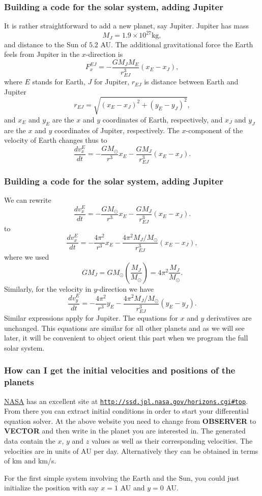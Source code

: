 \documentclass{beamer}
\begin{document}
\begin{frame}
\frametitle{Building a code for the solar system, adding Jupiter}

\begin{block}{}
It is rather straightforward to add a new planet, say Jupiter.
Jupiter has mass
\[
M_J=1.9\times 10^{27}\mathrm{kg},
\]
and distance to the Sun of $5.2$ AU. 
The additional gravitational force the Earth feels from Jupiter in the $x$-direction is
  \[
   F_{x}^{EJ}=-\frac{GM_JM_E}{r_{EJ}^3}(x_E-x_J),
  \]
where $E$ stands for Earth, $J$ for Jupiter, $r_{EJ}$ is distance between Earth and Jupiter
\[
r_{EJ} = \sqrt{(x_E-x_J)^2+(y_E-y_J)^2},
\]
and $x_E$ and $y_E$ are the $x$ and $y$ coordinates of Earth, respectively, and 
$x_J$ and $y_J$ are the $x$ and $y$ coordinates of Jupiter, respectively.
The $x$-component of the velocity of Earth changes thus to
\[
   \frac{dv_x^E}{dt}=-\frac{GM_{\odot}}{r^3}x_E-\frac{GM_J}{r_{EJ}^3}(x_E-x_J).
\]
\end{block}
\end{frame}

\begin{frame}
\frametitle{Building a code for the solar system, adding Jupiter}

\begin{block}{}
We can rewrite 
\[
   \frac{dv_x^E}{dt}=-\frac{GM_{\odot}}{r^3}x_E-\frac{GM_J}{r_{EJ}^3}(x_E-x_J).
\]
to
\[
   \frac{dv_x^E}{dt}=-\frac{4\pi^2}{r^3}x_E-\frac{4\pi^2M_J/M_{\odot}}{r_{EJ}^3}(x_E-x_J),
\]
where we used 
\[
GM_J = GM_{\odot}\left(\frac{M_J}{M_{\odot}}\right)=4\pi^2 \frac{M_J}{M_{\odot}}.
\]
Similarly, for the velocity in $y$-direction we have 
\[
   \frac{dv_y^E}{dt}=-\frac{4\pi^2}{r^3}y_E-\frac{4\pi^2M_J/M_{\odot}}{r_{EJ}^3}(y_E-y_J).
\]
Similar expressions apply for Jupiter. The equations for $x$ and $y$ 
derivatives are unchanged. This equations are similar for all other planets and as we will see later, it will be convenient to object orient this part when we program the full solar system.
\end{block}
\end{frame}

\begin{frame}
\frametitle{How can I get the initial velocities and positions of the planets}

\begin{block}{}
\href{{http://www.nasa.gov/index.html}}{NASA} has an excellent site at \href{{http://ssd.jpl.nasa.gov/horizons.cgi#top}}{\nolinkurl{http://ssd.jpl.nasa.gov/horizons.cgi\#top}}.
From there you can extract initial conditions in order to start your differential equation solver.
At the above website you need to change from \textbf{OBSERVER} to \textbf{VECTOR} and then write in the planet you are interested in.
The generated data contain the $x$, $y$ and $z$ values as well as their corresponding velocities. The velocities are in units of AU per day.
Alternatively they can be obtained in terms of km and km/s. 

For the first simple system involving the Earth and the Sun, you could just initialize the position with say $x=1$ AU
and $y=0$ AU. 
\end{block}
\end{frame}
\end{document}
